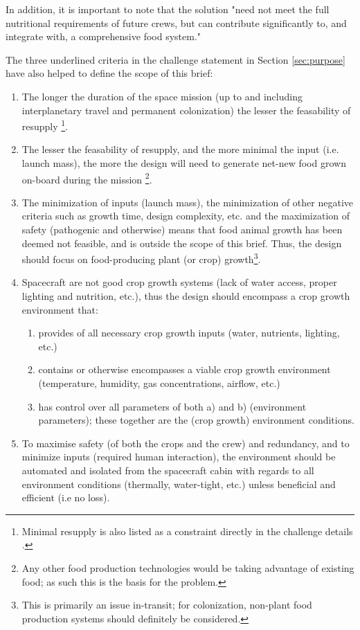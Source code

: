 \documentclass{report}
\begin{document}
In addition, it is important to note that the solution "need not meet the full nutritional requirements of 
future crews, but can contribute significantly to, and integrate with, a comprehensive food system." \cite{applicantguide}

The three underlined criteria in the challenge statement in Section \ref{sec:purpose} have also helped to define the 
scope of this brief:

\begin{enumerate}
\item The longer the duration of the space mission (up to and including interplanetary 
    travel and permanent colonization) the lesser the feasability of resupply
    \footnote{Minimal resupply is also listed as a constraint directly in the challenge 
    details \cite{applicantguide}.}.
\item The lesser the feasability of resupply, and the more minimal the input 
    (i.e. launch mass), the more the design will need to generate net-new food 
    grown on-board during the mission \footnote{Any other food production technologies 
    would be taking advantage of existing food; as such this is the basis for the 
    problem.}.
\item The minimization of inputs (launch mass), the minimization of other negative 
    criteria such as growth time, design complexity, etc. and the maximization of 
    safety (pathogenic and otherwise) means that food animal growth has been deemed 
    not feasible, and is outside the scope of this brief. Thus, the design should 
    focus on food-producing plant (or crop) growth\footnote{This is primarily an 
    issue in-transit; for colonization, non-plant food production systems should 
    definitely be considered.}.
\item Spacecraft are not good crop growth systems (lack of water access, proper 
    lighting and nutrition, etc.), thus the design should encompass a crop growth 
    environment that:
    \begin{enumerate}
        \item provides of all necessary crop growth inputs (water, nutrients, lighting, 
        etc.)
        \item contains or otherwise encompasses a viable crop growth environment 
        (temperature, humidity, gas concentrations, airflow, etc.)
        \item has control over all parameters of both a) and b) (environment parameters); 
        these together are the (crop growth) environment conditions.
    \end{enumerate}
\item To maximise safety (of both the crops and the crew) and redundancy, and to minimize 
    inputs (required human interaction), the environment should be automated and isolated 
    from the spacecraft cabin with regards to all environment conditions (thermally, 
    water-tight, etc.) unless beneficial and efficient (i.e no loss).


\end{enumerate}
\end{document}
